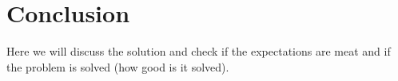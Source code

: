 \chapter{Conclusion}
Here we will discuss the solution and check if the expectations are meat and if the problem is solved (how good is it solved).
